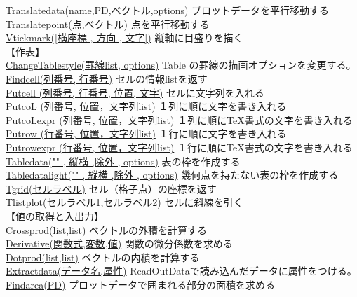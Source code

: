 \documentclass[papersize,a4paper,12pt,uplatex]{jsarticle}
\begin{document}
\begin{tabbing}
\hyperlink{translatedata}{Translatedata(name,PD,ベクトル,options)}  \>プロットデータを平行移動する\\
\hyperlink{translatepoint}{Translatepoint(点,ベクトル)}  \>点を平行移動する\\
\hyperlink{vtickmark}{Vtickmark([横座標 , 方向 , 文字])}    \>縦軸に目盛りを描く\\
【作表】\\
\hyperlink{changetablestyle}{ChangeTablestyle(罫線list, options)}  \>Table の罫線の描画オプションを変更する。\\
\hyperlink{findcell}{Findcell(列番号, 行番号)}  \>セルの情報listを返す\\
\hyperlink{putcell}{Putcell (列番号, 行番号, 位置, 文字)}   \>セルに文字列を入れる\\
\hyperlink{putcol}{PutcoL (列番号, 位置，文字列list)}   \>１列に順に文字を書き入れる\\
\hyperlink{putcolexpr}{PutcoLexpr (列番号, 位置，文字列list)}  \>１列に順に\TeX 書式の文字を書き入れる\\
\hyperlink{putrow}{Putrow (行番号, 位置，文字列list)}   \>１行に順に文字を書き入れる\\
\hyperlink{putrowexpr}{Putrowexpr (行番号, 位置，文字列list)} \>１行に順に\TeX 書式の文字を書き入れる\\
\hyperlink{tabledata}{Tabledata("" , 縦横 ,除外 , options)}  \>表の枠を作成する\\
\hyperlink{tabledatalight}{Tabledatalight("" , 縦横 ,除外 , options)}  \>幾何点を持たない表の枠を作成する\\
\hyperlink{tgrid}{Tgrid(セルラベル)} \>セル（格子点）の座標を返す\\
\hyperlink{tlistplot}{Tlistplot(セルラベル1,セルラベル2)} \>セルに斜線を引く\\
\vspace{\baselineskip}
【値の取得と入出力】\\
\hyperlink{crossprod}{Crossprod(list,list)}  \>ベクトルの外積を計算する\\
\hyperlink{derivative}{Derivative(関数式,変数,値)}  \>関数の微分係数を求める\\
\hyperlink{dotprod}{Dotprod(list,list)}  \>ベクトルの内積を計算する\\
\hyperlink{extractdata}{Extractdata(データ名,属性)}    \>ReadOutDataで読み込んだデータに属性をつける。\\
\hyperlink{findarea}{Findarea(PD)}  \>プロットデータで囲まれる部分の面積を求める\\

\end{tabbing}
\end{document}

